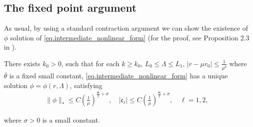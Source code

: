 \documentclass[11pt,a4paper]{amsart}
\begin{document}
\subsection{The fixed point argument}
As usual, by using a standard contraction argument we can show the existence of $\phi$ solution of \eqref{eq.intermediate_nonlinear_form} (for the proof, see Proposition 2.3 in \cite{WeiYan_2010a}).
\begin{proposition}\label{prop.intermediate_nonlinear_problem}
  There exists $k_0 > 0$, such that for each $k \geq k_0$, $L_0 \leq \Lambda \leq L_1$, $\left|r-\mu r_0\right| \leq \frac{1}{\mu^{\bar{\theta}}}$
 where $\bar{\theta}$ is a fixed small constant, \eqref{eq.intermediate_nonlinear_form} has a unique solution $\phi = \phi (r,\Lambda)$, satisfying
\begin{align*}
  \|\phi\|_{*} \leq C\left(\frac{1}{\mu}\right)^{\frac{\mathfrak m}{2}+\sigma}, \quad\left|\mathfrak c_{\ell}\right| \leq C\left(\frac{1}{\mu}\right)^{\frac{\mathfrak m}{2}+\sigma}, \quad \ell=1,2,
 \end{align*}

 where $\sigma>0$ is a small constant.
\end{proposition}
\end{document}
